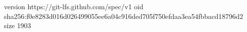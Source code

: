 version https://git-lfs.github.com/spec/v1
oid sha256:f0e8283d016d026499055ee6a04c916ded705f750efdaa3ea54fbbacd18796d2
size 1903
